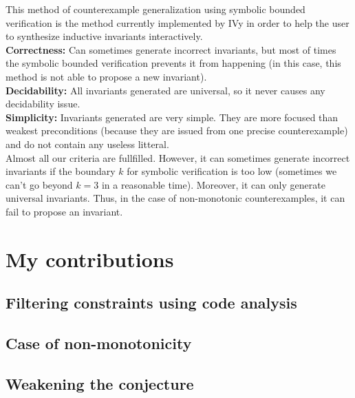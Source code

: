 \documentclass[11pt,a4paper,oldfontcommands,openany]{memoir}
\begin{document}
    This method of counterexample generalization using symbolic bounded verification is the method currently implemented by IVy in order to
    help the user to synthesize inductive invariants interactively.\\

    \textbf{Correctness:} Can sometimes generate incorrect invariants, but most of times the symbolic bounded verification prevents it from
    happening (in this case, this method is not able to propose a new invariant).\\

    \textbf{Decidability:} All invariants generated are universal, so it never causes any decidability issue.\\

    \textbf{Simplicity:} Invariants generated are very simple. They are more focused than weakest preconditions
    (because they are issued from one precise counterexample) and do not contain any useless litteral.\\

    Almost all our criteria are fullfilled. However, it can sometimes generate incorrect invariants if the boundary \(k\) for
    symbolic verification is too low (sometimes we can't go beyond \(k=3\) in a reasonable time).
    Moreover, it can only generate universal invariants. Thus, in the case of non-monotonic counterexamples, it can fail to propose an invariant.

\chapter{My contributions}


    \section{Filtering constraints using code analysis}



    \section{Case of non-monotonicity}

    \section{Weakening the conjecture}
\end{document}
